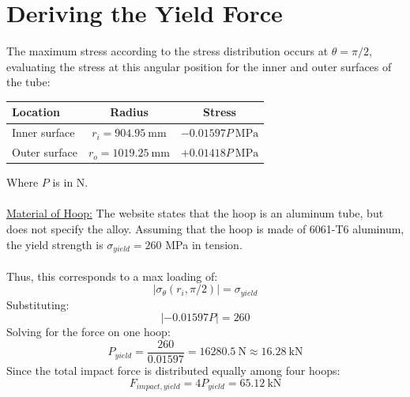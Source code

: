 \documentclass[11pt]{article}
\begin{document}
\section*{Deriving the Yield Force}
The maximum stress according to the stress distribution occurs at $\theta = \pi/2$, evaluating the stress at this angular position for the inner and outer surfaces of the tube:
\begin{table}[h!]
    \centering
    \renewcommand{\arraystretch}{1.6}
    \setlength{\tabcolsep}{18pt}
    \begin{tabular}{lcc}
        \hline
        \textbf{Location} & \textbf{Radius} & \textbf{Stress} \\
        \hline
        Inner surface & $r_i = 904.95 \ \mathrm{mm}$ & $-0.01597P \ \mathrm{MPa}$ \\
        Outer surface & $r_o = 1019.25 \ \mathrm{mm}$ & $+0.01418P \ \mathrm{MPa}$ \\
        \hline
    \end{tabular}
\end{table}
Where $P$ is in N.\\\\
\underline{Material of Hoop:} The website states that the hoop is an aluminum tube, but does not specify the alloy. Assuming that the hoop is made of 6061-T6 aluminum, the yield strength is $\sigma_{yield} = 260$ MPa in tension.\\\\
Thus, this corresponds to a max loading of:
\[\left|\sigma_\theta(r_i,\pi/2)\right|=\sigma_{yield}\]
Substituting:
\[|-0.01597P|=260\]
Solving for the force on one hoop:
\[\boxed{P_{yield}=\frac{260}{0.01597}=16280.5\ \mathrm{N}\approx16.28\ \mathrm{kN}}\]
Since the total impact force is distributed equally among four hoops:
\[\boxed{F_{impact,yield}=4P_{yield}=65.12\ \mathrm{kN}}\]
\end{document}
